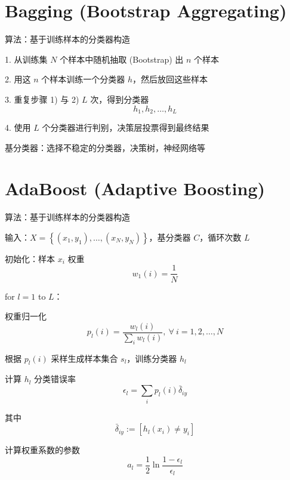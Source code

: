 \documentclass[openany]{ctexbook}
\theoremstyle{kaiti}
\theoremstyle{normal}
\begin{document}
\section{Bagging (Bootstrap Aggregating)}

算法：基于训练样本的分类器构造

1. 从训练集 $N$ 个样本中随机抽取 (Bootstrap) 出 $n$ 个样本

2. 用这 $n$ 个样本训练一个分类器 $h$，然后放回这些样本

3. 重复步骤 1) 与 2) $L$ 次，得到分类器 
\begin{equation}
  h_1, h_2,\dots ,h_L
\end{equation}

4. 使用 $L$ 个分类器进行判别，决策层投票得到最终结果

基分类器：选择不稳定的分类器，决策树，神经网络等

\section{AdaBoost (Adaptive Boosting)}

算法：基于训练样本的分类器构造

输入：$X=\left\{ \left(x_1,y_1 \right),\dots ,\left(x_N,y_N \right)\right\}$，基分类器 $C$，循环次数 $L$

初始化：样本 $x_i$ 权重
\begin{equation}
w_1(i)=\frac{1}{N}
\end{equation}

for $l=1$ to $L$：

权重归一化
\begin{equation}
p_l(i)=\frac{w_l(i)}{\displaystyle\sum_iw_l(i)},~\forall~i=1,2,\dots ,N
\end{equation}

根据 $p_l(i)$ 采样生成样本集合 $s_l$，训练分类器 $h_l$

计算 $h_l$ 分类错误率
\begin{equation}
\epsilon_l=\sum_ip_l(i)\bar{\delta}_{iy}
\end{equation}

其中
\begin{equation}
\bar{\delta}_{iy}:=\left[h_l\left(x_i \right)\ne y_i \right]
\end{equation}

计算权重系数的参数
\begin{equation}
a_l=\frac{1}{2}\ln\frac{1-\epsilon_l}{\epsilon_l}
\end{equation}
\end{document}
